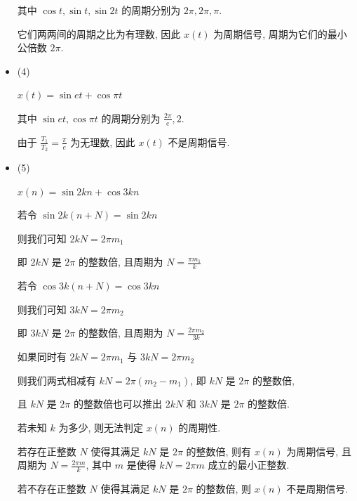 \documentclass[a4paper,UTF8]{article}
\numberwithin{equation}{section}
\begin{document}
\begin{framed}
\begin{spacing}{1.5}
\begin{itemize}
      其中 $\cos t, \sin t, \sin 2t$ 的周期分别为 $2\pi, 2\pi, \pi$.
      
      它们两两间的周期之比为有理数, 因此 $x(t)$ 为周期信号, 周期为它们的最小公倍数 $\displaystyle 2\pi$.
      
      \item (4)
      
      $x(t) = \sin et + \cos \pi t$
      
      其中 $\sin et, \cos \pi t$ 的周期分别为 $\displaystyle \frac{2\pi}{e}, 2$.
      
      由于 $\displaystyle \frac{T_1}{T_2} = \frac{\pi}{e}$ 为无理数, 因此 $x(t)$ 不是周期信号.
      
      \item (5)
      
      $x(n) = \sin 2kn + \cos 3kn$

      若令 $\sin 2k(n+N) = \sin 2kn$
      
      则我们可知 $2kN = 2\pi m_1$
      
      即 $2kN$ 是 $2\pi$ 的整数倍, 且周期为 $\displaystyle N = \frac{\pi m_1}{k}$
      
      若令 $\cos 3k(n+N) = \cos 3kn$
      
      则我们可知 $3kN = 2\pi m_2$
      
      即 $3kN$ 是 $2\pi$ 的整数倍, 且周期为 $\displaystyle N = \frac{2\pi m_2}{3k}$
      
      如果同时有 $2kN = 2\pi m_1$ 与 $3kN = 2\pi m_2$
      
      则我们两式相减有 $kN = 2\pi(m_2-m_1)$, 即 $kN$ 是 $2\pi$ 的整数倍,
      
      且 $kN$ 是 $2\pi$ 的整数倍也可以推出 $2kN$ 和 $3kN$ 是 $2\pi$ 的整数倍.
      
      若未知 $k$ 为多少, 则无法判定 $x(n)$ 的周期性.
      
      若存在正整数 $N$ 使得其满足 $kN$ 是 $2\pi$ 的整数倍, 则有 $x(n)$ 为周期信号, 且周期为 $\displaystyle N = \frac{2\pi m}{k}$, 其中 $m$ 是使得 $kN=2\pi m$ 成立的最小正整数.
      
      若不存在正整数 $N$ 使得其满足 $kN$ 是 $2\pi$ 的整数倍, 则 $x(n)$ 不是周期信号.
      
    \end{itemize}
\end{spacing}
\end{framed}


\newpage
\end{document}
